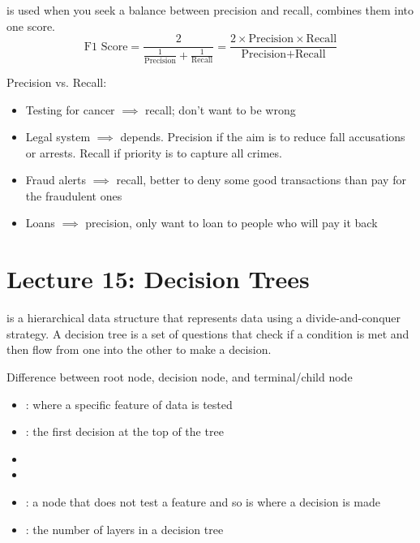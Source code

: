 \documentclass[12pt]{scrartcl}
\begin{document}
\begin{definition}
   is used when you seek a balance between precision and recall, combines them into one score.
  \[\text{F1 Score} = 
  \frac{2}{\frac{1}{\text{Precision}} + \frac{1}{\text{Recall}}} = \frac{2 \times \text{Precision} \times \text{Recall}}{\text{Precision} + \text{Recall}}\]
\end{definition}

\begin{note}
  Precision vs. Recall:

  \begin{itemize}
    \item Testing for cancer $\implies$ recall; don't want to be wrong
    \item Legal system $\implies$ depends. Precision if the aim is to reduce fall accusations or arrests. Recall if priority is to capture all crimes.
    \item Fraud alerts $\implies$ recall, better to deny some good transactions than pay for the fraudulent ones
    \item Loans $\implies$ precision, only want to loan to people who will pay it back
  \end{itemize}
\end{note}

\section{Lecture 15: Decision Trees}

\begin{definition}
   is a hierarchical data structure that represents data using a 
  divide-and-conquer strategy. A decision tree is a set of questions that check if a condition is met and 
  then flow from one into the other to make a decision.
\end{definition}

Difference between root node, decision node, and terminal/child node

\begin{definition}

  \hfill

  \begin{itemize}
    \item {}: where a specific feature of data is tested
    \item {}: the first decision at the top of the tree
    \item {}
    \item {}
    \item {}: a node that does not test a feature and so is where a decision is made
    \item {}: the number of layers in a decision tree
  \end{itemize}
\end{definition}
\end{document}
